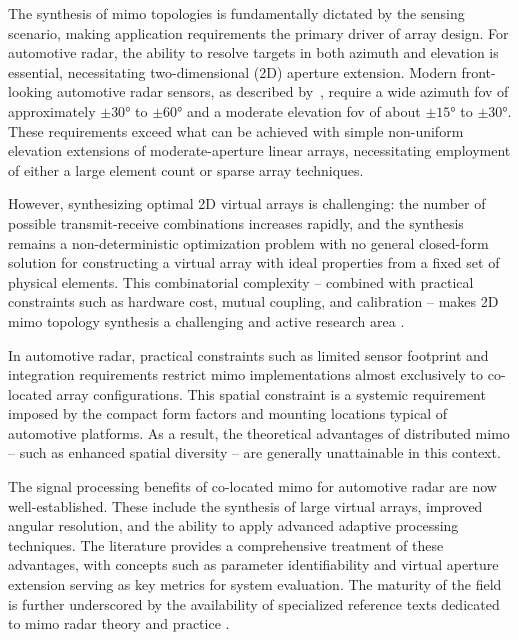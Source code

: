 The synthesis of \gls{mimo} topologies is fundamentally dictated by the sensing scenario, making application requirements the primary driver of array design.
For automotive radar, the ability to resolve targets in both azimuth and elevation is essential, necessitating two-dimensional (2D) aperture extension.
Modern front-looking automotive radar sensors, as described by~\textcite{waldschmidtAutomotiveRadarFirst2021}, require a wide azimuth \gls{fov} of approximately $\pm\ang{30}$ to $\pm\ang{60}$ and a moderate elevation \gls{fov} of about $\pm\ang{15}$ to $\pm\ang{30}$.
These requirements exceed what can be achieved with simple non-uniform elevation extensions of moderate-aperture linear arrays, necessitating employment of either a large element count or sparse array techniques.

However, synthesizing optimal 2D virtual arrays is challenging: the number of possible transmit-receive combinations increases rapidly, and the synthesis remains a non-deterministic optimization problem with no general closed-form solution for constructing a virtual array with ideal properties from a fixed set of physical elements.
This combinatorial complexity -- combined with practical constraints such as hardware cost, mutual coupling, and calibration -- makes 2D \gls{mimo} topology synthesis a challenging and active research area \parencite{zhugeStudyTwoDimensionalSparse2012}.

In automotive radar, practical constraints such as limited sensor footprint and integration requirements restrict \gls{mimo} implementations almost exclusively to co-located array configurations.
This spatial constraint is a systemic requirement imposed by the compact form factors and mounting locations typical of automotive platforms.
As a result, the theoretical advantages of distributed \gls{mimo} -- such as enhanced spatial diversity -- are generally unattainable in this context.

The signal processing benefits of co-located \gls{mimo} for automotive radar are now well-established.
These include the synthesis of large virtual arrays, improved angular resolution, and the ability to apply advanced adaptive processing techniques.
The literature provides a comprehensive treatment of these advantages, with concepts such as parameter identifiability \parencite{liParameterIdentifiabilityMIMO2007} and virtual aperture extension \parencite{liMIMORadarColocated2007} serving as key metrics for system evaluation.
The maturity of the field is further underscored by the availability of specialized reference texts dedicated to \gls{mimo} radar theory and practice \parencite{liMIMORadarSignal2025}.

